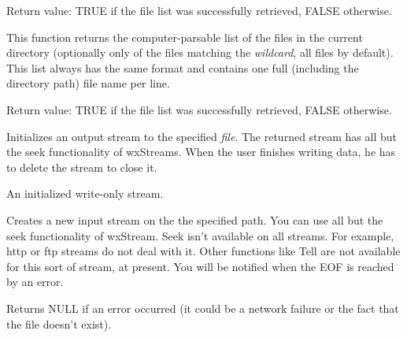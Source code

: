Return value: TRUE if the file list was successfully retrieved, FALSE
otherwise.



\label{wxftpgetfileslist}


This function returns the computer-parsable list of the files in the current
directory (optionally only of the files matching the {\it wildcard}, all files
by default). This list always has the same format and contains one full
(including the directory path) file name per line.

Return value: TRUE if the file list was successfully retrieved, FALSE
otherwise.




Initializes an output stream to the specified {\it file}. The returned
stream has all but the seek functionality of wxStreams. When the user finishes
writing data, he has to delete the stream to close it.


An initialized write-only stream.




\label{wxftpgetinput}


Creates a new input stream on the the specified path. You can use all but the seek
functionality of wxStream. Seek isn't available on all streams. For example,
http or ftp streams do not deal with it. Other functions like Tell
are not available for this sort of stream, at present.
You will be notified when the EOF is reached by an error.


Returns NULL if an error occurred (it could be a network failure or the fact
that the file doesn't exist).

